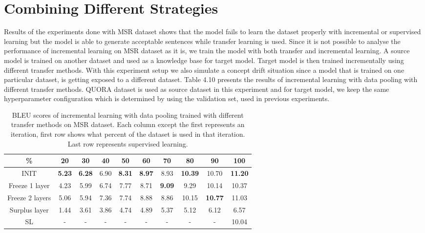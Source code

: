 \section{Combining Different Strategies}

Results of the experiments done with MSR dataset shows that the model fails to learn the dataset properly with incremental or supervised learning but the model is able to generate acceptable sentences while transfer learning is used. Since it is not possible to analyse the performance of incremental learning on MSR dataset as it is, we train the model with both transfer and incremental learning. A source model is trained on another dataset and used as a knowledge base for target model. Target model is then trained incrementally using different transfer methods. With this experiment setup we also simulate a concept drift situation since a model that is trained on one particular dataset, is getting exposed to a different dataset. Table 4.10 presents the results of incremental learning with data pooling with different transfer methods. QUORA dataset is used as source dataset in this experiment and for target model, we keep the same hyperparameter configuration which is determined by using the validation set, used in previous experiments.

\begin{table}[t]
\centering
\large
\begin{adjustbox}{width=1.2\textwidth,center=\textwidth} 
 \begin{tabular}{|c | c | c | c | c | c | c | c | c | c |} 
 \hline
 \% & 20 & 30 & 40 & 50 & 60 & 70 & 80 & 90 & 100 \\ [0.5ex] 
 \hline
  INIT & \textbf{5.23} & \textbf{6.28} & 6.90 & \textbf{8.31} & \textbf{8.97} & 8.93 & \textbf{10.39} & 10.70 & \textbf{11.20}  \\ 
 \hline
 Freeze 1 layer & 4.23 & 5.99 & 6.74 & 7.77 & 8.71 & \textbf{9.09} & 9.29 & 10.14 & 10.37 \\ 
 \hline
 Freeze 2 layers & 5.06 & 5.94 & 7.36 & 7.74 & 8.88 & 8.86 & 10.15 & \textbf{10.77} & 11.03 \\ 
  \hline
  Surplus layer & 1.44 & 3.61 & 3.86 & 4.74 & 4.89 & 5.37 & 5.12 & 6.12 & 6.57 \\ 
  \hline
  SL & - & - & - & - & - & - & - & - & 10.04 \\ 
 \hline
\end{tabular}
\end{adjustbox}
\caption{BLEU scores of incremental learning with data pooling trained with different transfer methods on MSR dataset. Each column except the first represents an iteration, first row shows what percent of the dataset is used in that iteration. Last row represents supervised learning.}
\end{table}

